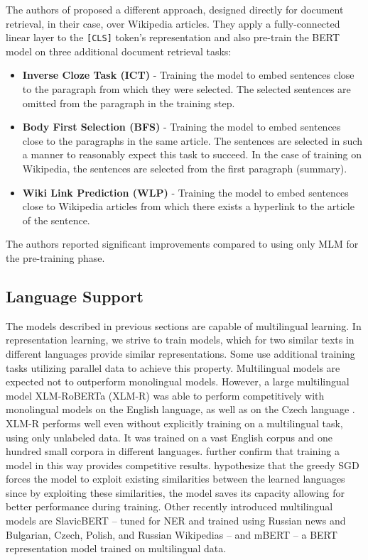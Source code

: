The authors of \citep{two-tower} proposed a different approach, designed directly for document retrieval, in their case, over Wikipedia articles. 
They apply a fully-connected linear layer to the \texttt{[CLS]} token's representation and also pre-train the BERT model on three additional document retrieval tasks:
\begin{itemize}
        \item \textbf{Inverse Cloze Task (ICT)} - Training the model to embed sentences close to the paragraph from which they were selected. The selected sentences are omitted from the paragraph in the training step.
        \item \textbf{Body First Selection (BFS)} - Training the model to embed sentences close to the paragraphs in the same article. The sentences are selected in such a manner to reasonably expect this task to succeed. In the case of training on Wikipedia, the sentences are selected from the first paragraph (summary).
        \item \textbf{Wiki Link Prediction (WLP)} - Training the model to embed sentences close to Wikipedia articles from which there exists a hyperlink to the article of the sentence.
\end{itemize}
The authors reported significant improvements compared to using only MLM for the pre-training phase.

\subsection{Language Support}

The models described in previous sections are capable of multilingual learning.
In representation learning, we strive to train models, which for two similar texts in different languages provide similar representations.
Some \citep{cross-lingual} use additional training tasks utilizing parallel data to achieve this property.
Multilingual models are expected not to outperform monolingual models.
However, a large multilingual model XLM-RoBERTa (XLM-R) \citep{xlmr} was able to perform competitively with monolingual models on the English language, as well as on the Czech language \citep{mackova}.
XLM-R performs well even without explicitly training on a multilingual task, using only unlabeled data.
It was trained on a vast English corpus and one hundred small corpora in different languages. 
\citet{cross-lingual} further confirm that training a model in this way provides competitive results.
\citet{mackova} hypothesize that the greedy SGD forces the model to exploit existing similarities between the learned languages since by exploiting these similarities, the model saves its capacity allowing for better performance during training.
Other recently introduced multilingual models are SlavicBERT \citep{deep-pavlov} -- tuned for NER and trained using Russian news and Bulgarian, Czech, Polish, and Russian Wikipedias -- and mBERT -- a BERT representation model trained on multilingual data.

